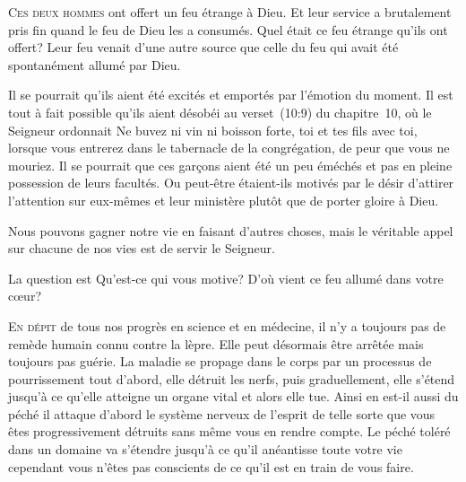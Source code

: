 \lettrine{C}{es deux hommes} ont offert un feu étrange à Dieu.
 Et leur service a brutalement pris fin quand le feu de Dieu les a consumés.
 Quel était ce feu étrange qu'ils ont offert?
 Leur feu venait d'une autre source que celle du feu
 qui avait été spontanément allumé par Dieu.

Il se pourrait qu'ils aient été excités et emportés par l'émotion du moment.
 Il est tout à fait possible qu'ils aient désobéi au verset~(10:9) du chapitre~10,
 où le Seigneur ordonnait\frcolon{}
 \Og Ne buvez ni vin ni boisson forte, toi et tes fils avec toi,
 lorsque vous entrerez dans le tabernacle de la congrégation,
 de peur que vous ne mouriez. \Fg{}
 Il se pourrait que ces gar\c{c}ons aient été un peu éméchés
 et pas en pleine possession de leurs facultés.
 Ou peut-être étaient-ils motivés par le désir d'attirer
 l'attention sur eux-mêmes et leur ministère plutôt que de porter gloire à Dieu.


Nous pouvons gagner notre vie en faisant d'autres choses,
 mais le véritable appel sur chacune de nos vies est de servir le Seigneur.

La question est\frcolon{} Qu'est-ce qui vous motive?
 D'où vient ce feu allumé dans votre c\oe{}ur? 

\dvrule







\lettrine{E}{n dépit} de tous nos progrès en science et en médecine,
 il n'y a toujours pas de remède humain connu contre la lèpre.
 Elle peut désormais être arrêtée mais toujours pas guérie.
 La maladie se propage dans le corps par un processus de pourrissement\frcolon{}
 tout d'abord, elle détruit les nerfs,
 puis graduellement, elle s'étend jusqu'à ce qu'elle atteigne
 un organe vital et alors elle tue.
 Ainsi en est-il aussi du péché\frcolon{} il attaque d'abord le système nerveux
 de l'esprit de telle sorte que vous êtes progressivement détruits
 sans même vous en rendre compte.
 Le péché toléré dans un domaine va s'étendre jusqu'à ce qu'il anéantisse
 toute votre vie \ocadr{}cependant vous n'êtes pas conscients
 de ce qu'il est en train de vous faire. 

